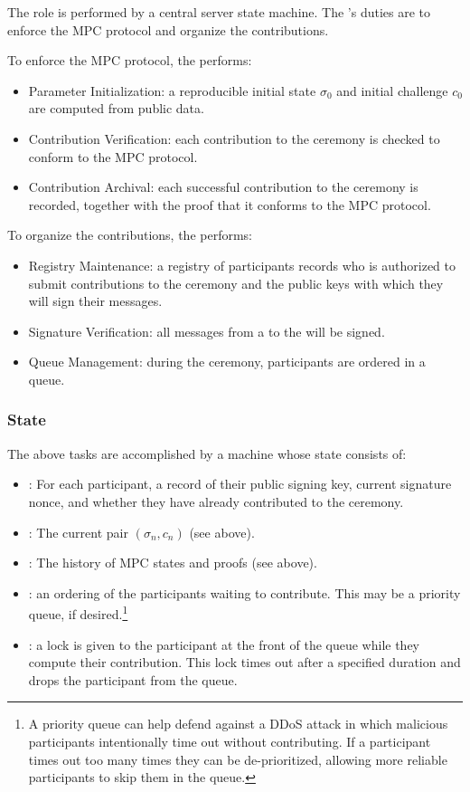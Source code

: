 The \Coordinator{} role is performed by a central server state machine. The \Coordinator{}'s duties are to enforce the MPC protocol and organize the contributions. 

To enforce the MPC protocol, the \Coordinator{} performs:
\begin{itemize}
    \item Parameter Initialization: a reproducible initial state $\sigma_0$ and initial challenge $c_0$ are computed from public data.
    \item Contribution Verification: each contribution to the ceremony is checked to conform to the MPC protocol.
    \item Contribution Archival: each successful contribution to the ceremony is recorded, together with the proof that it conforms to the MPC protocol.
\end{itemize}
To organize the contributions, the \Coordinator{} performs:
\begin{itemize}
    \item Registry Maintenance: a registry of participants records who is authorized to submit contributions to the ceremony and the public keys with which they will sign their messages.
    \item Signature Verification: all messages from a \Contributor{} to the \Coordinator{} will be signed.
    \item Queue Management: during the ceremony, participants are ordered in a queue.
\end{itemize}

\subsubsection*{State}
The above \Coordinator{} tasks are accomplished by a machine whose state consists of:
\begin{itemize}
    \item \Registry{}: For each participant, a record of their public signing key, current signature nonce, and whether they have already contributed to the ceremony.
    \item \MpcState{}: The current pair $(\sigma_n, c_n)$ (see above). 
    \item \Transcript{}: The history of MPC states and proofs (see above).
    \item \Queue{}: an ordering of the participants waiting to contribute. This may be a priority queue, if desired.\footnote{A priority queue can help defend against a DDoS attack in which malicious participants intentionally time out without contributing. If a participant times out too many times they can be de-prioritized, allowing more reliable participants to skip them in the queue.}
    \item \TimedLock{}: a lock is given to the participant at the front of the queue while they compute their contribution. This lock times out after a specified duration and drops the participant from the queue.
\end{itemize}


